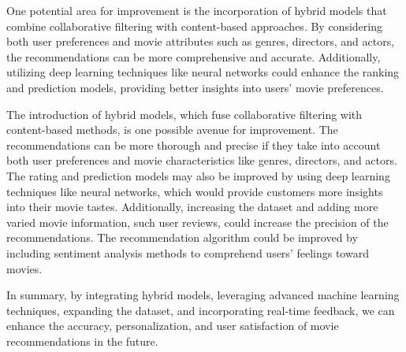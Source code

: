 \documentclass[11pt]{article}
\begin{document}
\vspace{0.3cm}

One potential area for improvement is the incorporation of hybrid models that combine collaborative filtering with content-based approaches. By considering both user preferences and movie attributes such as genres, directors, and actors, the recommendations can be more comprehensive and accurate. Additionally, utilizing deep learning techniques like neural networks could enhance the ranking and prediction models, providing better insights into users' movie preferences.

\vspace{0.3cm}

The introduction of hybrid models, which fuse collaborative filtering with content-based methods, is one possible avenue for improvement. The recommendations can be more thorough and precise if they take into account both user preferences and movie characteristics like genres, directors, and actors. The rating and prediction models may also be improved by using deep learning techniques like neural networks, which would provide customers more insights into their movie tastes. Additionally, increasing the dataset and adding more varied movie information, such user reviews, could increase the precision of the recommendations. The recommendation algorithm could be improved by including sentiment analysis methods to comprehend users' feelings toward movies.

\vspace{0.3cm}

In summary, by integrating hybrid models, leveraging advanced machine learning techniques, expanding the dataset, and incorporating real-time feedback, we can enhance the accuracy, personalization, and user satisfaction of movie recommendations in the future.

\pagebreak
\end{document}
